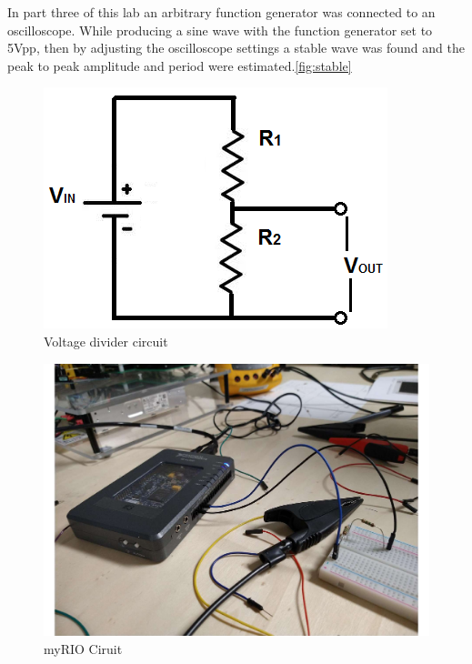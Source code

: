\documentclass[10pt,twocolumn]{article}
\begin{document}
	In part three of this lab an arbitrary function generator was connected to an oscilloscope. While producing a sine wave with the function generator set to 5Vpp, then by adjusting the oscilloscope settings a stable wave was found and the peak to peak amplitude and period were estimated.\autoref{fig:stable}
	
\begin{figure}
	\centering
	\includegraphics[width=.9\linewidth]{figures/vdc.PNG}
	\caption{Voltage divider circuit}
	\label{fig:circuit}
\end{figure}

\begin{figure}
	\centering
	\includegraphics[width=.9\linewidth]{figures/myr.pdf}
	\caption{myRIO Ciruit}
	\label{fig:myrio}
\end{figure}
\end{document}
